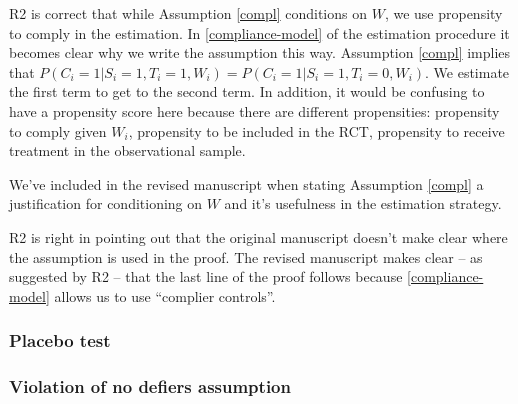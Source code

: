 \documentclass[hidelinks,12pt,letterpaper]{article}
\begin{document}

R2 is correct that while Assumption \ref{compl} conditions on $W$, we use propensity to comply in the estimation.  In \ref{compliance-model} of the estimation procedure it becomes clear why we write the assumption this way. Assumption \ref{compl} implies that $P(C_i=1 | S_i=1, T_i=1, W_i) = P(C_i=1 | S_i=1, T_i=0, W_i)$. We estimate the first term to get to the second term. In addition, it would be confusing to have a propensity score here because there are different propensities: propensity to comply given $W_i$, propensity to be included in the RCT, propensity to receive treatment in the observational sample. 

We've included in the revised manuscript when stating Assumption \ref{compl} a justification for conditioning on $W$ and it's usefulness in the estimation strategy.

R2 is right in pointing out that the original manuscript doesn't make clear where the assumption is used in the proof. The revised manuscript makes clear -- as suggested by R2 -- that the last line of the proof follows because \ref{compliance-model} allows us to use ``complier controls''. 

\subsubsection{Placebo test}

\subsubsection{Violation of no defiers assumption}
\end{document}
